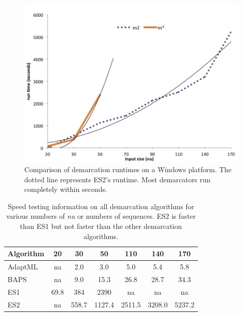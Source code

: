 \begin{figure}[h!]
  \centering
    \includegraphics[scale=0.7]{images/SpeedWindows-CH4}
      \caption[Demarcation runtime test on a Windows platform.]{Comparison of demarcation runtimes on a Windows platform. The dotted line represents ES2's runtime. Most demarcators run completely within seconds.}
    \label{fig:WindowsSpeed}
\end{figure}

\begin{table}
\centering
    \begin{tabular}{l|cccccc}
    Algorithm & 20   & 30    & 50     & 110    & 140    & 170    \\ \hline
    AdaptML   & na   & 2.0   & 3.0    & 5.0    & 5.4    & 5.8    \\
    BAPS      & na   & 9.0   & 15.3   & 26.8   & 28.7   & 34.3   \\
    ES1       & 69.8 & 384   & 2390   & na     & na     & na     \\
    ES2       & na   & 558.7 & 1127.4 & 2511.5 & 3208.0 & 5237.2 \\
    \end{tabular}
    \caption[Speed testing information on all demarcation algorithms.]{Speed testing information on all demarcation algorithms for various numbers of \emph{nu} or numbers of sequences. ES2 is faster than ES1 but not faster than the other demarcation algorithms.}
    \label{tab:WindowsSpeed}
\end{table}

